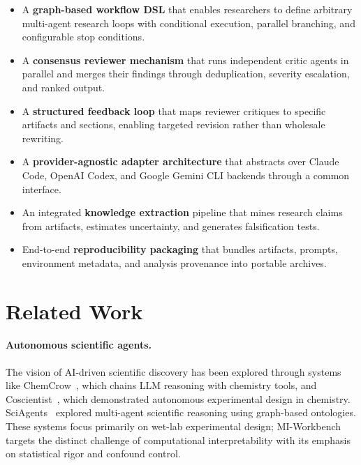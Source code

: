 \documentclass[11pt,a4paper]{article}
\begin{document}
\begin{itemize}[leftmargin=*]
  \item A \textbf{graph-based workflow DSL} that enables researchers to define arbitrary multi-agent research loops with conditional execution, parallel branching, and configurable stop conditions.
  \item A \textbf{consensus reviewer mechanism} that runs independent critic agents in parallel and merges their findings through deduplication, severity escalation, and ranked output.
  \item A \textbf{structured feedback loop} that maps reviewer critiques to specific artifacts and sections, enabling targeted revision rather than wholesale rewriting.
  \item A \textbf{provider-agnostic adapter architecture} that abstracts over Claude Code, OpenAI Codex, and Google Gemini CLI backends through a common interface.
  \item An integrated \textbf{knowledge extraction} pipeline that mines research claims from artifacts, estimates uncertainty, and generates falsification tests.
  \item End-to-end \textbf{reproducibility packaging} that bundles artifacts, prompts, environment metadata, and analysis provenance into portable archives.
\end{itemize}


\section{Related Work}
\label{sec:related}

\paragraph{Autonomous scientific agents.}
The vision of AI-driven scientific discovery has been explored through systems like ChemCrow~\citep{bran2024chemcrow}, which chains LLM reasoning with chemistry tools, and Coscientist~\citep{boiko2023autonomous}, which demonstrated autonomous experimental design in chemistry.
SciAgents~\citep{ghafarollahi2024sciagents} explored multi-agent scientific reasoning using graph-based ontologies.
These systems focus primarily on wet-lab experimental design; MI-Workbench targets the distinct challenge of computational interpretability with its emphasis on statistical rigor and confound control.
\end{document}
